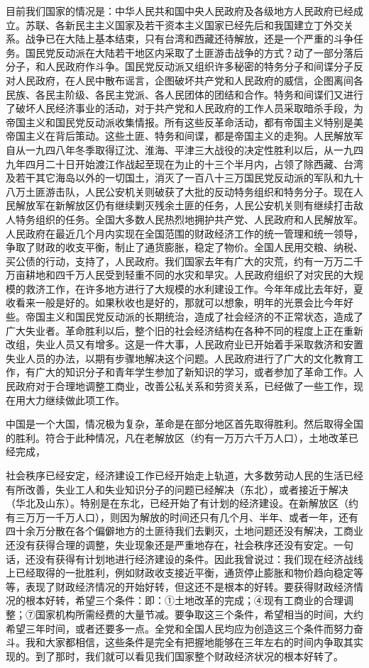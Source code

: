 目前我们国家的情况是：中华人民共和国中央人民政府及各级地方人民政府已经成立。苏联、各新民主主义国家及若干资本主义国家已经先后和我国建立丁外交关系。战争已在大陆上基本结束，只有台湾和西藏还待解放，还是一个严重的斗争任务。国民党反动派在大陆若干地区内采取了土匪游击战争的方式？动了一部分落后分子，和人民政府作斗争。国民党反动派又组织许多秘密的特务分子和间谍分子反对人民政府，在人民中散布谣言，企图破坏共产党和人民政府的威信，企图离间各民族、各民主阶级、各民主党派、各人民团体的团结和合作。特务和间谍们又进行了破坏人民经济事业的活动，对于共产党和人民政府的工作人员采取暗杀手段，为帝国主义和国民党反动派收集情报。所有这些反革命活动，都有帝国主义特别是美帝国主义在背后策动。这些土匪、特务和间谍，都是帝国主义的走狗。人民解放军自从一九四八年冬季取得辽沈、淮海、平津三大战役的决定性胜利以后，从一九四九年四月二十日开始渡江作战起至现在为止的十三个半月内，占领了除西藏、台湾及若干其它海岛以外的一切国土，消灭了一百八十三万国民党反动派的军队和九十八万土匪游击队，人民公安机关则破获了大批的反动特务组织和特务分子。现在人民解放军在新解放区仍有继续剿灭残余土匪的任务，人民公安机关则有继续打击敌人特务组织的任务。全国大多数人民热烈地拥护共产党、人民政府和人民解放军。人民政府在最近几个月内实现在全国范围的财政经济工作的统一管理和统一领导，争取了财政的收支平衡，制止了通货膨胀，稳定了物价。全国人民用交粮、纳税、买公债的行动，支持了，人民政府。我们国家去年有广大的灾荒，约有一万万二千万亩耕地和四千万人民受到轻重不同的水灾和旱灾。人民政府组织了对灾民的大规模的救济工作，在许多地方进行了大规模的水利建设工作。今年年成比去年好，夏收看来一般是好的。如果秋收也是好的，那就可以想象，明年的光景会比今年好些。帝国主义和国民党反动派的长期统治，造成了社会经济的不正常状态，造成了广大失业者。革命胜利以后，整个旧的社会经济结构在各种不同的程度上正在重新改组，失业人员又有增多。这是一件大事，人民政府业已开始着手采取救济和安置失业人员的办法，以期有步骤地解决这个问题。人民政府进行了广大的文化教育工作，有广大的知识分子和青年学生参加了新知识的学习，或者参加了革命工作。人民政府对于合理地调整工商业，改善公私关系和劳资关系，已经做了一些工作，现在用大力继续做此项工作。

中国是一个大国，情况极为复杂，革命是在部分地区首先取得胜利。然后取得全国的胜利。符合于此种情况，凡在老解放区（约有一万万六千万人口），土地改革已经完成，

社会秩序已经安定，经济建设工作已经开始走上轨道，大多数劳动人民的生活已经有所改善，失业工人和失业知识分子的问题已经解决（东北），或者接近于解决（华北及山东）。特别是在东北，已经开始了有计划的经济建设。在新解放区（约有三万万一千万人口），则因为解放的时间还只有几个月、半年、或者一年，还有四十余万分散在各个偏僻地方的土匪待我们去剿灭，土地问题还没有解决，工商业还没有获得合理的调整，失业现象还是严重地存在，社会秩序还没有安定。一句话，还没有获得有计划地进行经济建设的条件。因此我曾说过：我们现在经济战线上已经取得的一批胜利，例如财政收支接近平衡，通货停止膨胀和物价趋向稳定等等，表现了财政经济情况的开始好转，但这还不是根本的好转。要获得财政经济情况的根本好转，希望三个条件：即：①土地改革的完成；④现有工商业的合理调整；⑦国家机构所需经费的大量节减。要争取这三个条件，希望相当的时间，大约希望三年时间，或者还要多一点。全党和全国人民均应为创造这三个条件而努力奋斗。我和大家都相信，这些条件是完全有把握地能够在三年左右的时间内争取其实现的。到了那时，我们就可以看见我们国家整个财政经济状况的根本好转了。

